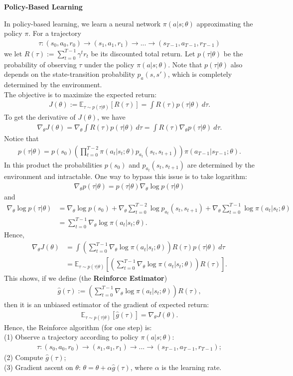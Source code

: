 \documentclass[12pt,oneside]{article}
\newcommand{\ra}[0]{\rightarrow}
\newcommand{\BE}[0]{\mathbb{E}}
\newcommand{\ali}[1]{\begin{align*}#1\end{align*}}
\newcommand{\ga}[0]{\gamma}
\theoremstyle{plain}
\theoremstyle{remark}
\begin{document}
{\bf Policy-Based Learning\\}

In policy-based learning, we learn a neural network $\pi(a | s; \theta)$ approximating the policy $\pi$. For a trajectory
\ali{\tau: (s_0, a_0, r_0) \ra (s_1, a_1, r_1) \ra ... \ra (s_{T-1}, a_{T-1}, r_{T-1})}
we let $R(\tau) := \sum_{t=0}^{T-1} \ga^t r_t$ be its discounted total return. Let $p(\tau | \theta)$ be the probability of observing $\tau$ under the policy $\pi(a | s; \theta)$. Note that $p(\tau|\theta)$ also depends on the state-transition probability $p_a(s, s')$, which is completely determined by the environment.\\
The objective is to maximize the expected return:
\ali{ J(\theta) := \BE_{\tau \sim p(\tau|\theta)} \left[ R(\tau) \right] = \int R(\tau) p(\tau | \theta) \ d\tau.}
To get the derivative of $J(\theta)$, we have
\ali{ \nabla_\theta J(\theta) = \nabla_\theta \int R(\tau) p(\tau | \theta) \ d\tau = \int R(\tau) \nabla_\theta p(\tau | \theta) \ d\tau.}
Notice that 
\ali{p(\tau | \theta) = p(s_0) \left(\prod_{t=0}^{T-2} \pi(a_t | s_t; \theta) p_{a_t}(s_t, s_{t+1})\right) \pi(a_{T-1} | s_{T-1}; \theta).}  
In this product the probabilities $p(s_0)$ and $p_{a_t}(s_t, s_{t+1})$ are determined by the environment and intractable. One way to bypass this issue is to take logarithm:
\ali{\nabla_\theta p(\tau|\theta) = p(\tau | \theta) \nabla_\theta \log p(\tau | \theta)}
and
\ali{\nabla_\theta \log p(\tau | \theta) &= \nabla_\theta \log p(s_0) + \nabla_\theta \sum_{t=0}^{T-2} \log p_{a_t}(s_t, s_{t+1}) + \nabla_\theta \sum_{t=0}^{T-1} \log \pi(a_t|s_t;\theta) \\
                                         &= \sum_{t=0}^{T-1} \nabla_\theta \log \pi(a_t|s_t;\theta).}
Hence,
\ali{\nabla_\theta J(\theta) &= \int \left(\sum_{t=0}^{T-1} \nabla_\theta \log \pi(a_t|s_t;\theta)\right) R(\tau) p(\tau|\theta) \ d\tau \\
                            &= \BE_{\tau \sim p(\tau|\theta)} \left[\left(\sum_{t=0}^{T-1} \nabla_\theta \log \pi(a_t|s_t;\theta)\right) R(\tau)\right].}
This shows, if we define (the {\bf Reinforce Estimator})
\ali{\hat{g}(\tau) := \left(\sum_{t=0}^{T-1} \nabla_\theta \log \pi(a_t|s_t;\theta)\right) R(\tau),}
then it is an unbiased estimator of the gradient of expected return:
\ali{ \BE_{\tau \sim p(\tau|\theta)} \left[ \hat{g}(\tau) \right] = \nabla_\theta J(\theta).}
Hence, the Reinforce algorithm (for one step) is:\\
(1) Observe a trajectory according to policy $\pi(a|s;\theta)$:
\ali{\tau: (s_0, a_0, r_0) \ra (s_1, a_1, r_1) \ra ... \ra (s_{T-1}, a_{T-1}, r_{T-1});}
(2) Compute $\hat{g}(\tau)$;\\
(3) Gradient ascent on $\theta$: $\theta = \theta + \alpha \hat{g}(\tau)$, where $\alpha$ is the learning rate.\\
\end{document}
